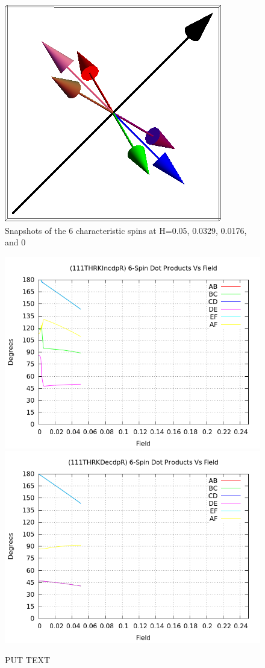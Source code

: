 \documentclass{article}
\begin{document}
\begin{figure}[ht]
\includegraphics[scale=0.33]{111_3000/501S005to000R.png}
\caption{Snapshots of the 6 characteristic spins at H=0.05, 0.0329, 0.0176, and 0}
\end{figure}
\clearpage

\begin{figure}
\centering
\includegraphics[scale=0.55]{HVariedData/Pictures/111THRKIncdpR.png}
\includegraphics[scale=0.55]{HVariedData/Pictures/111THRKDecdpR.png}
\caption{PUT TEXT}
\end{figure}
\clearpage
\end{document}
